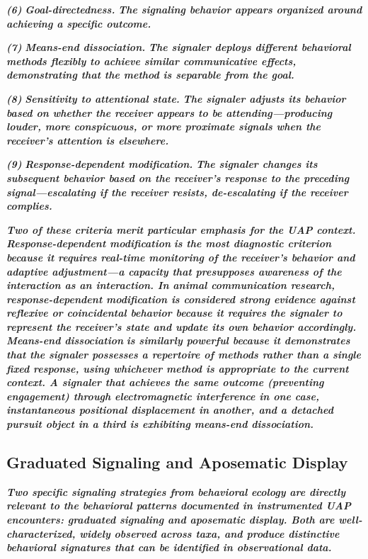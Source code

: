 \documentclass[11pt,letterpaper]{article}
\begin{document}
\textbf{\textit{(6) }}\textbf{\textit{Goal-directedness. }}\textbf{\textit{The signaling behavior appears organized around achieving a specific outcome.}}


\textbf{\textit{(7) }}\textbf{\textit{Means-end dissociation. }}\textbf{\textit{The signaler deploys different behavioral methods flexibly to achieve similar communicative effects, demonstrating that the method is separable from the goal.}}


\textbf{\textit{(8) }}\textbf{\textit{Sensitivity to attentional state. }}\textbf{\textit{The signaler adjusts its behavior based on whether the receiver appears to be attending---producing louder, more conspicuous, or more proximate signals when the receiver's attention is elsewhere.}}


\textbf{\textit{(9) }}\textbf{\textit{Response-dependent modification. }}\textbf{\textit{The signaler changes its subsequent behavior based on the receiver's response to the preceding signal---escalating if the receiver resists, de-escalating if the receiver complies.}}


\textbf{\textit{Two of these criteria merit particular emphasis for the UAP context. }}\textbf{\textit{Response-dependent modification}}\textbf{\textit{ is the most diagnostic criterion because it requires real-time monitoring of the receiver's behavior and adaptive adjustment---a capacity that presupposes awareness of the interaction as an interaction. In animal communication research, response-dependent modification is considered strong evidence against reflexive or coincidental behavior because it requires the signaler to represent the receiver's state and update its own behavior accordingly. }}\textbf{\textit{Means-end dissociation}}\textbf{\textit{ is similarly powerful because it demonstrates that the signaler possesses a repertoire of methods rather than a single fixed response, using whichever method is appropriate to the current context. A signaler that achieves the same outcome (preventing engagement) through electromagnetic interference in one case, instantaneous positional displacement in another, and a detached pursuit object in a third is exhibiting means-end dissociation.}}


\subsection{Graduated Signaling and Aposematic Display}

\textbf{\textit{Two specific signaling strategies from behavioral ecology are directly relevant to the behavioral patterns documented in instrumented UAP encounters: graduated signaling and aposematic display. Both are well-characterized, widely observed across taxa, and produce distinctive behavioral signatures that can be identified in observational data.}}
\end{document}
